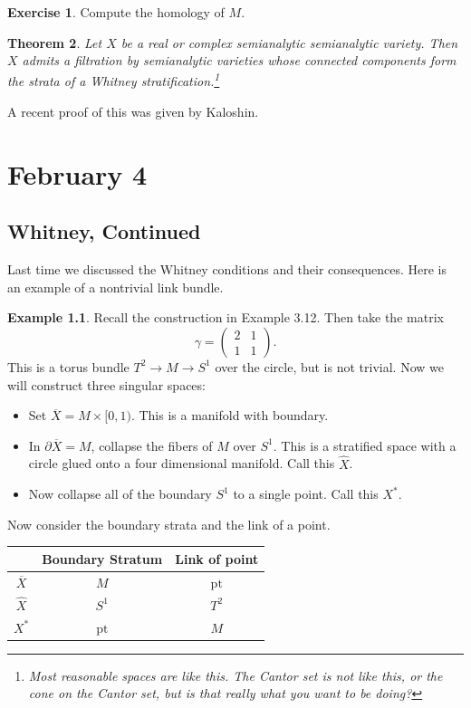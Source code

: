 \documentclass[leqno, openany]{memoir}
\newtheorem{thm}{Theorem}[chapter]
\theoremstyle{definition}
\newtheorem{exm}[thm]{Example}
\newtheorem{exer}[thm]{Exercise}
\theoremstyle{remark}
\theoremstyle{plain}
\theoremstyle{definition}
\theoremstyle{remark}
\newcommand{\mr}[1]{\mathrm{#1}}
\begin{document}
\begin{exer}
    Compute the homology of $M$.
\end{exer}

\begin{thm}
    Let $X$ be a real or complex semianalytic semianalytic variety. Then $X$ admits a filtration by semianalytic varieties whose connected components form the strata of a Whitney stratification.\footnote{Most reasonable spaces are like this. The Cantor set is not like this, or the cone on the Cantor set, but is that really what you want to be doing?}
\end{thm}
A recent proof of this was given by Kaloshin.

\chapter{February 4}%
\label{cha:february_4}

\section{Whitney, Continued}%
\label{sec:whitney_continued}

Last time we discussed the Whitney conditions and their consequences. Here is an example of a nontrivial link bundle. 

\begin{exm}
    Recall the construction in Example 3.12. Then take the matrix 
    \[ \gamma = \begin{pmatrix}
        2 & 1 \\ 1 & 1
    \end{pmatrix}. \]
    This is a torus bundle $T^2 \to M \to S^1$ over the circle, but is not trivial. Now we will construct three singular spaces:
    \begin{itemize}
        \item Set $\overline{X} = M \times [0,1)$. This is a manifold with boundary.
        \item In $\partial \overline{X} = M$, collapse the fibers of $M$ over $S^1$. This is a stratified space with a circle glued onto a four dimensional manifold. Call this $\widehat{X}$.
        \item Now collapse all of the boundary $S^1$ to a single point. Call this $X^*$.
    \end{itemize}
    Now consider the boundary strata and the link of a point.
    \begin{center}
        \begin{tabular}{ccc}
            \toprule
            & Boundary Stratum & Link of point \\
            \midrule
            $\overline{X}$ & $M$ & $\mr{pt}$ \\
            $\widehat{X}$ & $S^1$ & $T^2$ \\
            $X^*$ & $\mr{pt}$ & $M$ \\
            \bottomrule
        \end{tabular}
    \end{center}
\end{exm}
\end{document}

